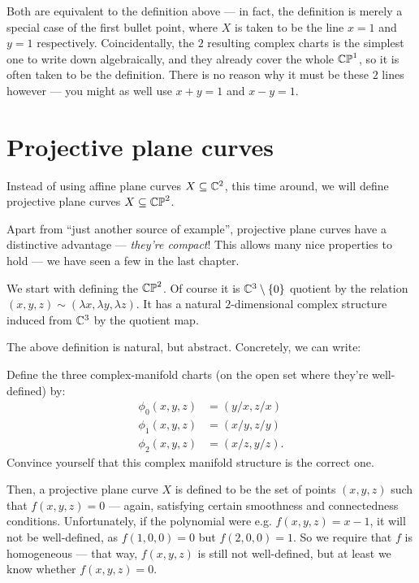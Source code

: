 Both are equivalent to the definition above --- in fact, the definition is merely a special case of
the first bullet point, where $X$ is taken to be the line $x = 1$ and $y = 1$ respectively.
Coincidentally, the $2$ resulting complex charts is the simplest one to write down algebraically,
and they already cover the whole $\mathbb{CP}^1$, so it is often taken to be the definition.
There is no reason why it must be these $2$ lines however --- you might as well use $x + y = 1$ and
$x - y = 1$.

\section{Projective plane curves}

Instead of using affine plane curves $X \subseteq \mathbb C^2$, this time around, we will define
projective plane curves $X \subseteq \mathbb{CP}^2$.

Apart from ``just another source of example'', projective plane curves have a distinctive advantage
--- \emph{they're compact}! This allows many nice properties to hold --- we have seen a few in the
last chapter.

We start with defining the  $\mathbb{CP}^2$.
Of course it is $\mathbb C^3 \setminus \{ 0 \}$ quotient by the relation $(x, y, z) \sim (\lambda x,
\lambda y, \lambda z)$.
It has a natural $2$-dimensional complex structure induced from
$\mathbb C^3$ by the quotient map.

The above definition is natural, but abstract. Concretely, we can write:
\begin{ques}
	Define the three complex-manifold charts (on the open set where they're well-defined) by:
	\begin{align*}
		\phi_0(x, y, z) &= (y/x, z/x) \\
		\phi_1(x, y, z) &= (x/y, z/y) \\
		\phi_2(x, y, z) &= (x/z, y/z).
	\end{align*}
	Convince yourself that this complex manifold structure is the correct one.
\end{ques}

Then, a projective plane curve $X$ is defined to be the set of points $(x, y, z)$ such that
$f(x, y, z) = 0$ --- again, satisfying certain smoothness and connectedness conditions.
Unfortunately, if the polynomial were e.g. $f(x, y, z) = x-1$, it will not be well-defined,
as $f(1, 0, 0) = 0$ but $f(2, 0, 0) = 1$.
So we require that $f$ is homogeneous --- that way, $f(x, y, z)$ is still not well-defined, but at
least we know whether $f(x, y, z) = 0$.

